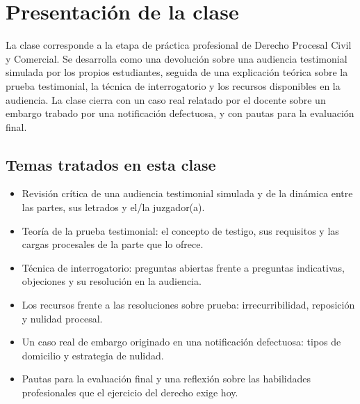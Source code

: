 \documentclass[12pt,oneside]{book}
\begin{document}
\tableofcontents

\chapter*{Presentación de la clase}

La clase corresponde a la etapa de práctica profesional de Derecho Procesal Civil y Comercial. Se desarrolla como una devolución sobre una audiencia testimonial simulada por los propios estudiantes, seguida de una explicación teórica sobre la prueba testimonial, la técnica de interrogatorio y los recursos disponibles en la audiencia. La clase cierra con un caso real relatado por el docente sobre un embargo trabado por una notificación defectuosa, y con pautas para la evaluación final.

\section*{Temas tratados en esta clase}

\begin{itemize}
    \item Revisión crítica de una audiencia testimonial simulada y de la dinámica entre las partes, sus letrados y el/la juzgador(a).
    \item Teoría de la prueba testimonial: el concepto de testigo, sus requisitos y las cargas procesales de la parte que lo ofrece.
    \item Técnica de interrogatorio: preguntas abiertas frente a preguntas indicativas, objeciones y su resolución en la audiencia.
    \item Los recursos frente a las resoluciones sobre prueba: irrecurribilidad, reposición y nulidad procesal.
    \item Un caso real de embargo originado en una notificación defectuosa: tipos de domicilio y estrategia de nulidad.
    \item Pautas para la evaluación final y una reflexión sobre las habilidades profesionales que el ejercicio del derecho exige hoy.
\end{itemize}
\end{document}

